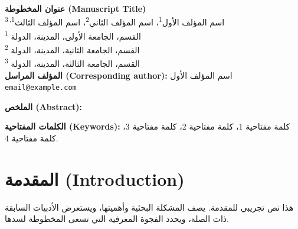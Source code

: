 \documentclass[11pt,a4paper]{article}
\begin{document}
\thispagestyle{fancy}

\begin{center}
{\LARGE\bfseries عنوان المخطوطة (Manuscript Title)}\\[1em]
{\large
اسم المؤلف الأول\textsuperscript{1}،
اسم المؤلف الثاني\textsuperscript{2}،
اسم المؤلف الثالث\textsuperscript{1,\,3}
}\\[1em]
{\small
\textsuperscript{1} القسم، الجامعة الأولى، المدينة، الدولة\\
\textsuperscript{2} القسم، الجامعة الثانية، المدينة، الدولة\\
\textsuperscript{3} القسم، الجامعة الثالثة، المدينة، الدولة
}\\[0.8em]
{\small \textbf{المؤلف المراسل (Corresponding author):} اسم المؤلف الأول}\\
{\small \texttt{email@example.com}}
\end{center}

\vspace{0.5em}

\begin{center}
\begin{minipage}{0.9\textwidth}
\noindent\textbf{الملخص (Abstract):}

\vspace{0.5em}
\noindent\textbf{الكلمات المفتاحية (Keywords):} كلمة مفتاحية 1، كلمة مفتاحية 2، كلمة مفتاحية 3، كلمة مفتاحية 4.
\end{minipage}
\end{center}

\vspace{1em}


\section{المقدمة (Introduction)}
\label{sec:intro}

هذا نص تجريبي للمقدمة. يصف المشكلة البحثية وأهميتها، ويستعرض الأدبيات السابقة ذات الصلة، ويحدد الفجوة المعرفية التي تسعى المخطوطة لسدها.
\end{document}
